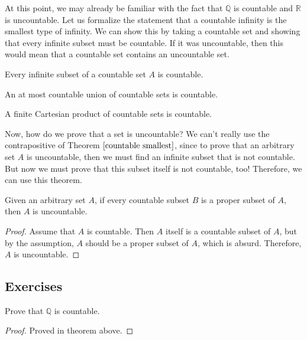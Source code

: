 \documentclass{article}
\begin{document}
    At this point, we may already be familiar with the fact that $\mathbb{Q}$ is countable and $\mathbb{R}$ is uncountable. Let us formalize the statement that a countable infinity is the smallest type of infinity. We can show this by taking a countable set and showing that every infinite subset must be countable. If it was uncountable, then this would mean that a countable set contains an uncountable set. 

    \begin{theorem}
      \label{countable smallest}
      Every infinite subset of a countable set $A$ is countable. 
    \end{theorem}

    \begin{theorem}
      An at most countable union of countable sets is countable. 
    \end{theorem}

    \begin{theorem}
      A finite Cartesian product of countable sets is countable. 
    \end{theorem}

    Now, how do we prove that a set is uncountable? We can't really use the contrapositive of Theorem $\ref{countable smallest}$, since to prove that an arbitrary set $A$ is uncountable, then we must find an infinite subset that is not countable. But now we must prove that this subset itself is not countable, too! Therefore, we can use this theorem. 

    \begin{theorem}
      Given an arbitrary set $A$, if every countable subset $B$ is a proper subset of $A$, then $A$ is uncountable. 
    \end{theorem}
    \begin{proof}
      Assume that $A$ is countable. Then $A$ itself is a countable subset of $A$, but by the assumption, $A$ should be a proper subset of $A$, which is absurd. Therefore, $A$ is uncountable. 
    \end{proof}

  \subsection{Exercises}

    \begin{exercise}
      Prove that $\mathbb{Q}$ is countable. 
    \end{exercise}
    \begin{proof}
      Proved in theorem above. 
    \end{proof}
\end{document}
